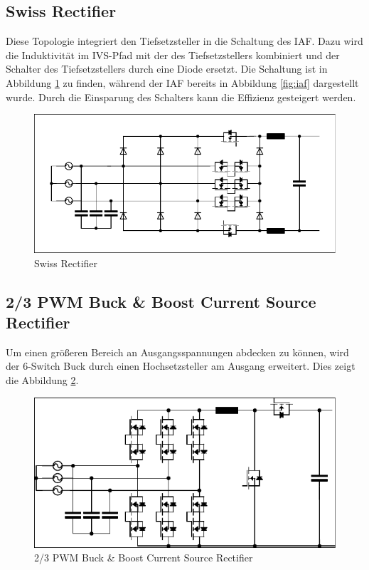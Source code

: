 	\subsection{Swiss Rectifier}
		Diese Topologie integriert den Tiefsetzsteller in die Schaltung des \gls{IAF}. Dazu wird die Induktivität im IVS-Pfad mit der des Tiefsetzstellers kombiniert und der Schalter des Tiefsetzstellers durch eine Diode ersetzt. Die Schaltung ist in Abbildung \ref{fig:swiss} zu finden, während der IAF bereits in Abbildung \ref{fig:iaf} dargestellt wurde. Durch die Einsparung des Schalters kann die Effizienz gesteigert werden.
		\begin{figure}[H]
			\centering
			\includegraphics[width=0.9\linewidth]{content/Grafiken/Swiss}
			\caption{Swiss Rectifier}
			\label{fig:swiss}
		\end{figure}
		
	\subsection{2/3 PWM Buck \& Boost Current Source Rectifier}	
		Um einen größeren Bereich an Ausgangsspannungen abdecken zu können, wird der 6-Switch Buck durch einen Hochsetzsteller am Ausgang erweitert. Dies zeigt die Abbildung \ref{fig:23pwmbuckboost}. 
		\begin{figure}[H]
			\centering
			\includegraphics[width=0.9\linewidth]{content/Grafiken/23PWMBuckBoost}
			\caption{2/3 PWM Buck \& Boost Current Source Rectifier}
			\label{fig:23pwmbuckboost}
		\end{figure}
